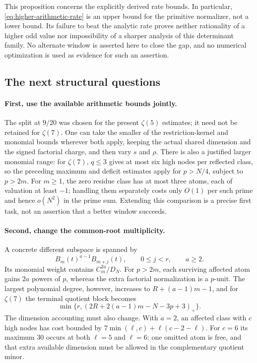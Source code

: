 \documentclass[11pt,letterpaper]{article}
\theoremstyle{definition}
\newcommand{\pos}[1]{\left(#1\right)_{+}}
\begin{document}
This proposition concerns the explicitly derived rate bounds.
In particular, \eqref{eq:higher-arithmetic-rate} is an upper bound
for the primitive normalizer, not a lower bound. Its failure to beat
the analytic rate proves neither rationality of a higher odd value
nor impossibility of a sharper analysis of this determinant family.
No alternate window is asserted here to close the gap, and no
numerical optimization is used as evidence for such an assertion.

\subsection{The next structural questions}

\paragraph{First, use the available arithmetic bounds jointly.}
The split at $9/20$ was chosen for the present $\zeta(5)$ estimates;
it need not be retained for $\zeta(7)$. One can take the smaller of
the restriction-kernel and monomial bounds wherever both apply,
keeping the actual shared dimension and the signed factorial charge,
and then vary $s$ and $\rho$. There is also a justified larger
monomial range: for $\zeta(7)$, $q\le3$ gives at most six high nodes
per reflected class, so the preceding maximum and deficit estimates
apply for $p>N/4$, subject to $p>2m$. For $m\ge1$, the zero residue class has at
most three atoms, each of valuation at least $-1$; handling them
separately costs only $O(1)$ per such prime and hence $o(N^2)$ in
the prime sum. Extending this comparison is a precise first task,
not an assertion that a better window succeeds.

\paragraph{Second, change the common-root multiplicity.}
A concrete different subspace is spanned by
\begin{equation}\label{eq:higher-powered-window}
 B_m(t)^{a-1}B_{m+j}(t),\qquad 0\le j<r,\qquad a\ge2.
\end{equation}
Its monomial weight contains $C_m^{2a}/D_N$. For $p>2m$, each
surviving affected atom gains $2a$ powers of $p$, whereas the extra
factorial normalization is a $p$-unit. The largest polynomial degree,
however, increases to $R+(a-1)m-1$, and for $\zeta(7)$ the terminal
quotient block becomes
\[
 \min\{r,\pos{2R+2(a-1)m-N-3p+3}\}.
\]
The dimension accounting must also change. With $a=2$, an affected
class with $c$ high nodes has cost bounded by
$7\min(\ell,c)+\ell(c-2-\ell)$.
For $c=6$ its maximum $30$ occurs at both $\ell=5$ and $\ell=6$:
one omitted atom is free, and that extra available dimension must
be allowed in the complementary quotient minor.
\end{document}

